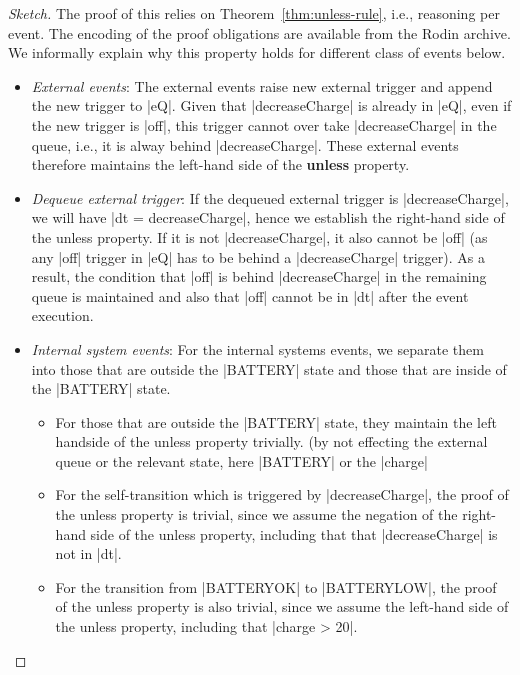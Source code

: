 \begin{proof}[Sketch]
 The proof of this relies on Theorem~\ref{thm:unless-rule}, i.e.,
 reasoning per event.  The encoding of the proof obligations are
 available from the Rodin archive. We informally explain why this
 property holds for different class of events below.
 \begin{itemize}
 \item \emph{External events}: The external events raise new external
   trigger and append the new trigger to |eQ|. Given that
   |decreaseCharge| is already in |eQ|, even if the new trigger is
   |off|, this trigger cannot over take |decreaseCharge| in the queue,
   i.e., it is alway behind |decreaseCharge|. These external events
   therefore maintains the left-hand side of the \textbf{unless} property.
   
 \item \emph{Dequeue external trigger}: If the dequeued external
   trigger is |decreaseCharge|, we will have |dt = {decreaseCharge}|,
   hence we establish the right-hand side of the unless property.
   If it is not |decreaseCharge|, it also cannot be |off| (as any
   |off| trigger in |eQ| has to be behind a |decreaseCharge|
   trigger). As a result, the condition that |off| is behind
   |decreaseCharge| in the remaining queue is maintained and also that
   |off| cannot be in |dt| after the event execution.
   
 \item \emph{Internal system events}: For the internal systems events,
   we separate them into those that are outside the |BATTERY| state
   and those that are inside of the |BATTERY| state.
   \begin{itemize}
   \item For those that are outside the |BATTERY| state, they
     maintain the left handside of the unless property trivially. (by
     not effecting the external queue or the relevant state, here
     |BATTERY| or the |charge|
     
   \item For the self-transition which is triggered by
     |decreaseCharge|, the proof of the unless property is trivial,
     since we assume the negation of the right-hand side of the unless
     property, including that that |decreaseCharge| is not in |dt|.
     
   \item For the transition from |BATTERYOK| to |BATTERYLOW|, the
     proof of the unless property is also trivial, since we assume the
     left-hand side of the unless property, including that |charge > 20|.
   \end{itemize}
 \end{itemize}
\end{proof}
